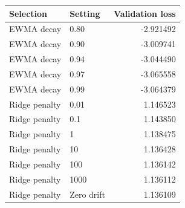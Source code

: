 \begin{tabular}{llr}
\toprule
Selection & Setting & Validation loss \\
\midrule
EWMA decay & 0.80 & -2.921492 \\
EWMA decay & 0.90 & -3.009741 \\
EWMA decay & 0.94 & -3.044490 \\
EWMA decay & 0.97 & -3.065558 \\
EWMA decay & 0.99 & -3.064379 \\
Ridge penalty & 0.01 & 1.146523 \\
Ridge penalty & 0.1 & 1.143850 \\
Ridge penalty & 1 & 1.138475 \\
Ridge penalty & 10 & 1.136428 \\
Ridge penalty & 100 & 1.136142 \\
Ridge penalty & 1000 & 1.136112 \\
Ridge penalty & Zero drift & 1.136109 \\
\bottomrule
\end{tabular}

